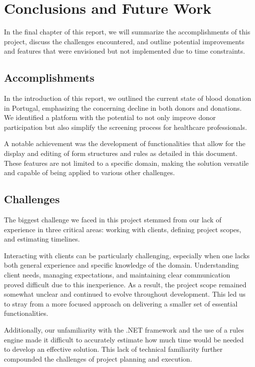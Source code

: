 \chapter{Conclusions and Future Work} \label{cap:future}
In the final chapter of this report, we will summarize the accomplishments of this project, discuss the challenges encountered, and outline potential improvements and features that were envisioned but not implemented due to time constraints.
\section{Accomplishments}

In the introduction of this report, we outlined the current state of blood donation in Portugal, emphasizing the concerning decline in both donors and donations. We identified a platform with the potential to not only improve donor participation but also simplify the screening process for healthcare professionals.

A notable achievement was the development of functionalities that allow for the display and editing of form structures and rules as detailed in this document. These features are not limited to a specific domain, making the solution versatile and capable of being applied to various other challenges.

\section{Challenges}
The biggest challenge we faced in this project stemmed from our lack of experience in three critical areas: working with clients, defining project scopes, and estimating timelines.

Interacting with clients can be particularly challenging, especially when one lacks both general experience and specific knowledge of the domain. Understanding client needs, managing expectations, and maintaining clear communication proved difficult due to this inexperience. As a result, the project scope remained somewhat unclear and continued to evolve throughout development. This led us to stray from a more focused approach on delivering a smaller set of essential functionalities.

Additionally, our unfamiliarity with the .NET framework and the use of a rules engine made it difficult to accurately estimate how much time would be needed to develop an effective solution. This lack of technical familiarity further compounded the challenges of project planning and execution.





